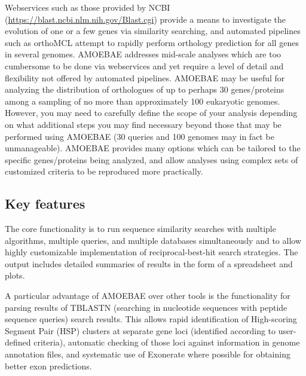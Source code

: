 \documentclass[12pt,letterpaper]{article}
\begin{document}
\begin{linenumbers}
    Webservices such as those provided by NCBI
    (\url{https://blast.ncbi.nlm.nih.gov/Blast.cgi}) \citep{camacho2009}
    provide a means to investigate the evolution of one or a few genes via
    similarity searching, and automated pipelines such as orthoMCL
    \citep{li2003} attempt to rapidly perform orthology prediction for all
    genes in several genomes. AMOEBAE addresses mid-scale analyses
    which are too cumbersome to be done via webservices and yet require a
    level of detail and flexibility not offered by automated pipelines. AMOEBAE
    may be useful for analyzing the distribution of orthologues of up to
    perhaps 30 genes/proteins among a sampling of no more than approximately
    100 eukaryotic genomes.  However, you may need to carefully define the
    scope of your analysis depending on what additional steps you may find
    necessary beyond those that may be performed using AMOEBAE (30 queries and
    100 genomes may in fact be unmanageable). AMOEBAE provides many options
    which can be tailored to the specific genes/proteins being analyzed, and
    allow analyses using complex sets of customized criteria to be reproduced
    more practically. 



\subsection{Key features}

The core functionality is to run sequence similarity searches with multiple
    algorithms, multiple queries, and multiple databases simultaneously
    and to allow highly customizable implementation
    of reciprocal-best-hit search strategies. The output includes detailed
    summaries of results in the form of a spreadsheet and plots.
    
    A particular advantage of AMOEBAE over other tools is the functionality for
    parsing results of TBLASTN (searching in nucleotide sequences with peptide
    sequence queries) search results. This allows rapid identification of
    High-scoring Segment Pair (HSP) clusters at separate gene loci (identified
    according to user-defined criteria), automatic checking of those loci
    against information in genome annotation files, and systematic use of
    Exonerate \citep{slater2005} where possible for obtaining better exon
    predictions.  



\end{linenumbers}
\end{document}
